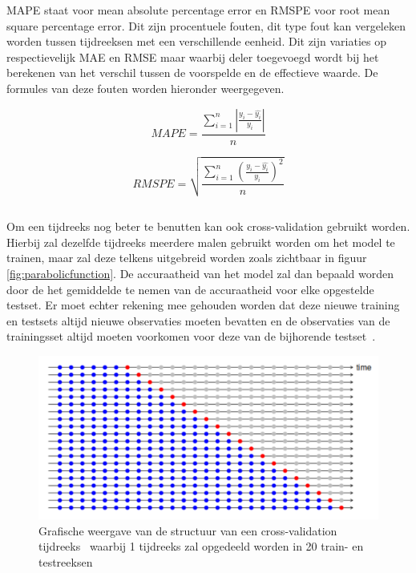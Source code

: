 MAPE staat voor mean absolute percentage error en RMSPE voor root mean square percentage error. Dit zijn procentuele fouten, dit type fout kan vergeleken worden tussen tijdreeksen met een verschillende eenheid. Dit zijn variaties op respectievelijk MAE en RMSE maar waarbij deler toegevoegd wordt bij het berekenen van het verschil tussen de voorspelde en de effectieve waarde. De formules van deze fouten worden hieronder weergegeven.

\begin{equation}
MAPE = \frac{\sum_{i=1}^{n} |\frac{y_i - \hat{y_i}}{y_i}|}{n}
\end{equation}

\begin{equation}
RMSPE = \sqrt{\frac{\sum_{i=1}^{n} (\frac{y_i - \hat{y_i}}{y_i})^2}{n}}
\end{equation}

\subsection{}

Om een tijdreeks nog beter te benutten kan ook cross-validation gebruikt worden. Hierbij zal dezelfde tijdreeks meerdere malen gebruikt worden om het model te trainen, maar zal deze telkens uitgebreid worden zoals zichtbaar in figuur \ref{fig:parabolicfunction}. De accuraatheid van het model zal dan bepaald worden door de het gemiddelde te nemen van de accuraatheid voor elke opgestelde testset. Er moet echter rekening mee gehouden worden dat deze nieuwe training en testsets altijd nieuwe observaties moeten bevatten en de observaties van de trainingsset altijd moeten voorkomen voor deze van de bijhorende testset~\autocite{Shrivastava2020}.

\begin{figure}
    \centering
    \caption{Grafische weergave van de structuur van een cross-validation tijdreeks~\autocite{Hyndman2018} waarbij 1 tijdreeks zal opgedeeld worden in 20 train- en testreeksen}
    \label{fig:cross_validation_ts}
    \includegraphics[width=0.9\linewidth]{cross_validation_ts}
\end{figure}


